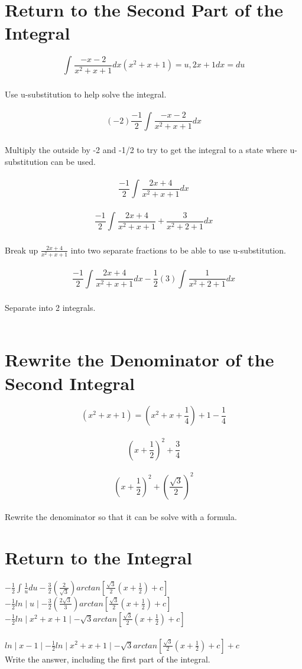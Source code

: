 \documentclass[12 pt]{article}
\begin{document}
\section{Return to the Second Part of the Integral}
$$\int_{}^{} \frac{-x-2}{x^2+x+1} dx (x^2+x+1)=u, 2x+1dx=du$$\\
Use u-substitution to help solve the integral.\\\\
$$(-2)\frac{-1}{2}\int_{}^{} \frac{-x-2}{x^2+x+1} dx$$\\
Multiply the outside by -2 and -1/2 to try to get the integral to a state where u-substitution can be used.\\\\
$$\frac{-1}{2}\int_{}^{} \frac{2x+4}{x^2+x+1} dx$$\\
$$\frac{-1}{2}\int_{}^{} \frac{2x+4}{x^2+x+1}+ \frac{3}{x^2+2+1} dx$$\\
Break up $\frac{2x+4}{x^2+x+1}$ into two separate fractions to be able to use u-substitution.\\\\
$$\frac{-1}{2}\int_{}^{} \frac{2x+4}{x^2+x+1} dx- \frac{1}{2}(3)\int_{}^{} \frac{1}{x^2+2+1} dx$$\\
Separate into 2 integrals.\\\\
\section{Rewrite the Denominator of the Second Integral}
$$(x^2+x+1)=(x^2+x+\frac{1}{4})+1-\frac{1}{4}$$\\
$$(x+\frac{1}{2})^2+\frac{3}{4}$$\\
$$(x+\frac{1}{2})^2+(\frac{\sqrt{3}}{2})^2$$\\
Rewrite the denominator so that it can be solve with a formula.
\section{Return to the Integral}
$-\frac{1}{2}\int_{}^{} \frac{1}{u}du-\frac{3}{2}(\frac{2}{\sqrt{3}})
arctan[\frac{\sqrt{3}}{2}(x+\frac{1}{2})+c]$\\
$-\frac{1}{2}ln\mid u\mid-\frac{3}{2}(\frac{2\sqrt{3}}{3})arctan[\frac{\sqrt{3}}{2}(x+\frac{1}{2})+c]$\\
$-\frac{1}{2}ln\mid x^2+x+1\mid-\sqrt{3}arctan[\frac{\sqrt{3}}{2}(x+\frac{1}{2})+c]$\\\\
$ln\mid x-1\mid-\frac{1}{2}ln\mid x^2+x+1\mid-\sqrt{3}arctan[\frac{\sqrt{3}}{2}(x+\frac{1}{2})+c]+c$\\
Write the answer, including the first part of the integral.
\end{document}
